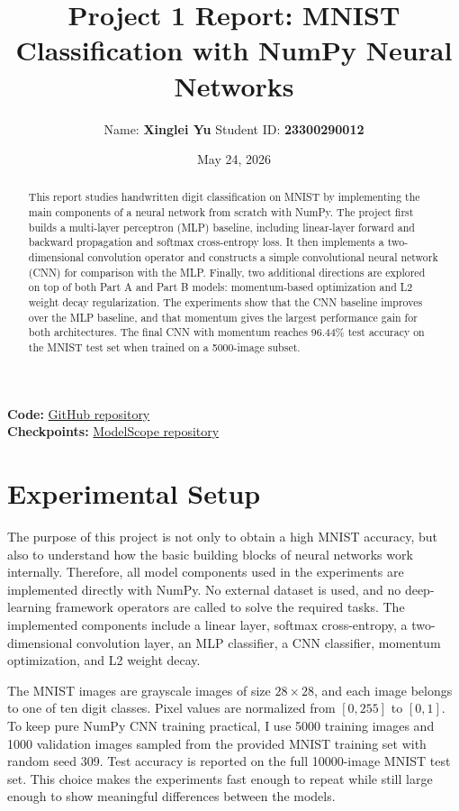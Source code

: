\documentclass[11pt]{article}
\title{Project 1 Report: MNIST Classification with NumPy Neural Networks}
\author{Name: \textbf{Xinglei Yu} \quad Student ID: \textbf{23300290012}}
\date{May 24, 2026}
\begin{document}
\maketitle

\noindent\textbf{Code:} \href{https://github.com/spoil-ed/Neural-Network-and-Deep-Learning-PJ1}{GitHub repository}\\
\textbf{Checkpoints:} \href{https://modelscope.cn/models/imspoiled/Neural-Network-and-Deep-Learning-PJ1-Checkpoint}{ModelScope repository}

\begin{abstract}
This report studies handwritten digit classification on MNIST by implementing the main components of a neural network from scratch with NumPy. The project first builds a multi-layer perceptron (MLP) baseline, including linear-layer forward and backward propagation and softmax cross-entropy loss. It then implements a two-dimensional convolution operator and constructs a simple convolutional neural network (CNN) for comparison with the MLP. Finally, two additional directions are explored on top of both Part A and Part B models: momentum-based optimization and L2 weight decay regularization. The experiments show that the CNN baseline improves over the MLP baseline, and that momentum gives the largest performance gain for both architectures. The final CNN with momentum reaches 96.44\% test accuracy on the MNIST test set when trained on a 5000-image subset.
\end{abstract}

\section{Experimental Setup}

The purpose of this project is not only to obtain a high MNIST accuracy, but also to understand how the basic building blocks of neural networks work internally. Therefore, all model components used in the experiments are implemented directly with NumPy. No external dataset is used, and no deep-learning framework operators are called to solve the required tasks. The implemented components include a linear layer, softmax cross-entropy, a two-dimensional convolution layer, an MLP classifier, a CNN classifier, momentum optimization, and L2 weight decay.

The MNIST images are grayscale images of size $28 \times 28$, and each image belongs to one of ten digit classes. Pixel values are normalized from $[0,255]$ to $[0,1]$. To keep pure NumPy CNN training practical, I use 5000 training images and 1000 validation images sampled from the provided MNIST training set with random seed 309. Test accuracy is reported on the full 10000-image MNIST test set. This choice makes the experiments fast enough to repeat while still large enough to show meaningful differences between the models.
\end{document}
